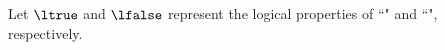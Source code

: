 \begin{definition}
\label{def:<==}
\label{def:<==>}
\label{def:impliedby}
\label{def:if}
Let $\ltrue$ and $\lfalse$ represent the logical properties of ``" and
``", respectively.
\end{definition}

